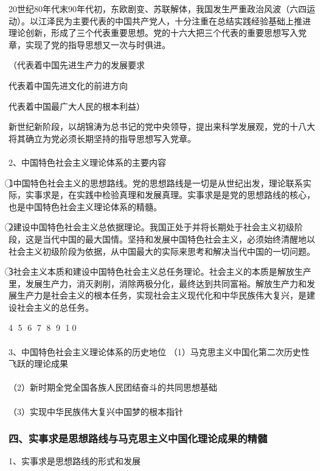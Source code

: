 \documentclass{ctexart}
\begin{document}
20世纪80年代末90年代初，东欧剧变、苏联解体，我国发生严重政治风波（六四运动）。以江泽民为主要代表的中国共产党人，十分注重在总结实践经验基础上推进理论创新，形成了三个代表重要思想。党的十六大把三个代表的重要思想写入党章，实现了党的指导思想又一次与时俱进。

（代表着中国先进生产力的发展要求

代表着中国先进文化的前进方向

代表着中国最广大人民的根本利益）

新世纪新阶段，以胡锦涛为总书记的党中央领导，提出来科学发展观，党的十八大将其确立为党必须长期坚持的指导思想写入党章。
\\\\

2、中国特色社会主义理论体系的主要内容

\textcircled{1}中国特色社会主义的思想路线。党的思想路线是一切是从世纪出发，理论联系实际，实事求是，在实践中检验真理和发展真理。实事求是是党的思想路线的核心，也是中国特色社会主义理论体系的精髓。

\textcircled{2}建设中国特色社会主义总依据理论。我国正处于并将长期处于社会主义初级阶段，这是当代中国的最大国情。坚持和发展中国特色社会主义，必须始终清醒地以社会主义初级阶段为依据，从中国最大的实际来思考和解决当代中国的一切问题。

\textcircled{3}社会主义本质和建设中国特色社会主义总任务理论。社会主义的本质是解放生产里，发展生产力，消灭剥削，消除两极分化，最终达到共同富裕。解放生产力和发展生产力是社会主义的根本任务，实现社会主义现代化和中华民族伟大复兴，是建设社会主义的总任务。

\textcircled{4}
\textcircled{5}
\textcircled{6}
\textcircled{7}
\textcircled{8}
\textcircled{9}
\textcircled{10}
\\\\

3、中国特色社会主义理论体系的历史地位
（1）马克思主义中国化第二次历史性飞跃的理论成果
\\\\
（2）新时期全党全国各族人民团结奋斗的共同思想基础
\\\\
（3）实现中华民族伟大复兴中国梦的根本指针


\subsubsection{四、实事求是思想路线与马克思主义中国化理论成果的精髓}
1、实事求是思想路线的形式和发展
\\\\
\end{document}
